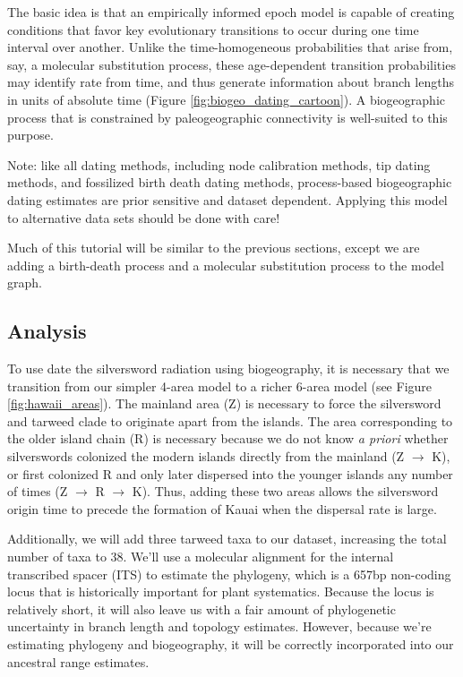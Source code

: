 The basic idea is that an empirically informed epoch model is capable of creating conditions that favor key evolutionary transitions to occur during one time interval over another.
Unlike the time-homogeneous probabilities that arise from, say, a molecular substitution process, these age-dependent transition probabilities may identify rate from time, and thus generate information about branch lengths in units of absolute time (Figure \ref{fig:biogeo_dating_cartoon}).
A biogeographic process that is constrained by paleogeographic connectivity is well-suited to this purpose.

Note: like all dating methods, including node calibration methods, tip dating methods, and fossilized birth death dating methods, process-based biogeographic dating estimates are prior sensitive and dataset dependent.
Applying this model to alternative data sets should be done with care!

Much of this tutorial will be similar to the previous sections, except we are adding a birth-death process and a molecular substitution process to the model graph.

\subsection*{Analysis}

To use date the silversword radiation using biogeography, it is necessary that we transition from our simpler 4-area model to a richer 6-area model (see Figure \ref{fig:hawaii_areas}).
The mainland area (Z) is necessary to force the silversword and tarweed clade to originate apart from the islands.
The area corresponding to the older island chain (R) is necessary because we do not know {\it a priori} whether silverswords colonized the modern islands directly from the mainland (Z $\rightarrow$ K), or first colonized R and only later dispersed into the younger islands any number of times (Z $\rightarrow$ R $\rightarrow$ K).
Thus, adding these two areas allows the silversword origin time to precede the formation of Kauai when the dispersal rate is large.

Additionally, we will add three tarweed taxa to our dataset, increasing the total number of taxa to 38.
We'll use a molecular alignment for the internal transcribed spacer (ITS) to estimate the phylogeny, which is a 657bp non-coding locus that is historically important for plant systematics.
Because the locus is relatively short, it will also leave us with a fair amount of phylogenetic uncertainty in branch length and topology estimates.
However, because we're estimating phylogeny and biogeography, it will be correctly incorporated into our ancestral range estimates.


